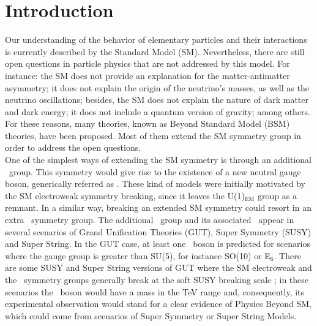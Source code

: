 \chapter*{Introduction}

Our understanding of the behavior of elementary particles and their interactions is 
currently described by the Standard Model (SM). Nevertheless, there are still open 
questions in particle physics that are not addressed by this model. For instance: the SM does 
not provide an explanation for the matter-antimatter asymmetry; it does not 
explain the origin of the neutrino's masses, as well as the 
neutrino oscillations; besides, the SM does not explain the nature of dark matter and dark energy;
it does not include a quantum version of gravity; among others. For these reasons, 
many theories, known as Beyond Standard Model (BSM) \cite{BSM} theories, have been proposed.
Most of them extend the SM symmetry group in order to address the open questions. \\

\noindent One of the simplest ways of extending the SM symmetry is through an additional
\Uprime~group. This symmetry would give rise to the existence of a new neutral gauge boson, generically 
referred as \Zprime. These kind of models were initially motivated by the 
SM electroweak symmetry breaking, since it leaves the U(1)$_{\text{EM}}$ group 
as a remnant. In a similar way, breaking an extended SM symmetry could resort 
in an extra \Uprime~symmetry group. The additional \Uprime~group and its associated
\Zprime~appear in several scenarios of Grand Unification Theories (GUT), Super Symmetry 
(SUSY) and Super String. In the GUT case, at least one \Zprime~boson
is predicted for scenarios where the gauge group is greater than SU(5), for instance 
SO(10) or E$_{6}$. There are some SUSY and Super String versions of GUT 
where the SM electroweak and the \Uprime~symmetry groups 
generally break at the soft SUSY breaking scale \cite{Langacker:2008yv}; in these scenarios 
the \Zprime~boson would have a mass in the TeV range and, consequently, its experimental
observation would stand for a clear evidence of Physics Beyond SM, which could 
come from scenarios of Super Symmetry or Super String Models. \\

